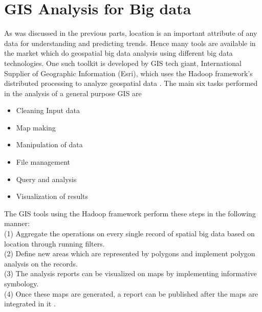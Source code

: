 \section{GIS Analysis for Big data}
As was discussed in the previous parts, location is an important attribute of any data for understanding and predicting trends. Hence many tools are available in the market which do geospatial big data analysis using different big data technologies. One such toolkit is developed by GIS tech giant, International Supplier of Geographic Information (Esri), which uses the Hadoop framework's distributed processing to analyze geospatial data \cite{link7}.
The main six tasks performed in the analysis of a general purpose GIS are
\begin{itemize}
    \item Cleaning Input data
    \item Map making
    \item Manipulation of data
    \item File management
    \item Query and analysis
    \item Visualization of results \cite{link8}
\end{itemize}

The GIS tools using the Hadoop framework perform these steps in the following manner: \\
(1) Aggregate the operations on every single record of spatial big data based on location through running filters.\\
(2) Define new areas which are represented by polygons and implement polygon analysis on the records.\\
(3) The analysis reports can be visualized on maps by implementing informative symbology.\\
(4) Once these maps are generated, a report can be published after the maps are integrated in it \cite{link7}. 

